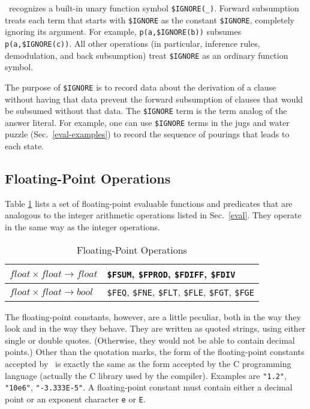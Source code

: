 \documentclass[11pt]{article}
\begin{document}
\otter\ recognizes a built-in unary function symbol
\verb:$IGNORE(_):.
Forward subsumption treats each term that starts with
\verb:$IGNORE: as the constant \verb:$IGNORE:, completely ignoring its
argument.  For example, \verb:p(a,$IGNORE(b)): subsumes
\verb:p(a,$IGNORE(c)):.
All other operations (in particular, inference rules, demodulation, and
back subsumption) treat \verb:$IGNORE: as an ordinary function symbol.

The purpose of \verb:$IGNORE: is to record data about the derivation
of a clause without having that data prevent the forward subsumption
of clauses that would be subsumed without that data.  The
\verb:$IGNORE: term is the term analog of the answer literal.  For
example, one can use \verb:$IGNORE: terms in the jugs and water puzzle
(Sec.~\ref{eval-examples}) to record the sequence of pourings that leads to
each state.

\subsection{Floating-Point Operations} \label{float}

Table \ref{float-tab} lists a set of floating-point evaluable
functions and predicates that are analogous to the integer arithmetic
operations listed in Sec.~\ref{eval}.  They operate in the
same way as the integer operations.
\begin{table}[ht] \centering
\caption{Floating-Point Operations}  \label{float-tab}
\begin{tabular}{|l|l|}
\hline
$float \times float \rightarrow float$  & \verb:$FSUM:, \verb:$FPROD:, \verb:$FDIFF:, \verb:$FDIV: \\
\hline
$float \times float \rightarrow bool$  & \verb:$FEQ:, \verb:$FNE:, \verb:$FLT:, \verb:$FLE:, \verb:$FGT:, \verb:$FGE: \\
\hline
\end{tabular}
\end{table}

The floating-point constants, however, are a little peculiar, both in
the way they look and in the way they behave.  They are written as
quoted strings, using either single or double quotes.  (Otherwise,
they would not be able to contain decimal points.)  Other than the
quotation marks, the form of the floating-point constants accepted by
\otter\ is exactly the same as the form accepted by the C programming
language (actually the C library used by the compiler).  Examples are
\verb:"1.2":, \verb:"10e6":, \verb:"-3.333E-5":.  A floating-point
constant must contain either a decimal point or an exponent character
\verb:e: or \verb:E:.
\end{document}
